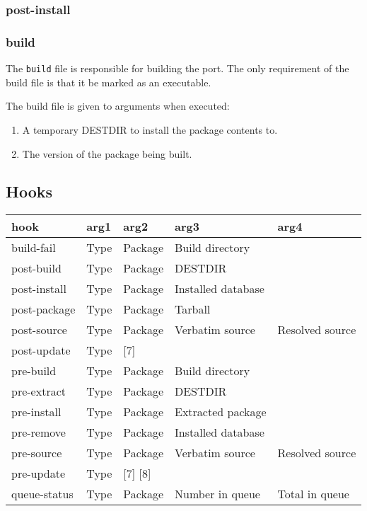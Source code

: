 \documentclass{article}
\begin{document}
\subsubsection{post-install}

\subsubsection{build}

The \texttt{build} file is responsible for building the port.
The only requirement of the build file is that it be marked as an executable.

The build file is given to arguments when executed:
\begin{enumerate}
\item A temporary DESTDIR to install the package contents to.
\item The version of the package being built.
\end{enumerate}

\subsection{Hooks}

\begin{center}
\begin{table}[]
\begin{tabular}{|l|l|l|l|l|}
  \hline
  hook          & arg1   & arg2     & arg3               & arg4           \\
  \hline
  build-fail    & Type   & Package  & Build directory    &                \\
  post-build    & Type   & Package  & DESTDIR            &                \\
  post-install  & Type   & Package  & Installed database &                \\
  post-package  & Type   & Package  & Tarball            &                \\
  post-source   & Type   & Package  & Verbatim source    & Resolved source\\
  post-update   & Type   & [7]      &                    &                \\
  pre-build     & Type   & Package  & Build directory    &                \\
  pre-extract   & Type   & Package  & DESTDIR            &                \\
  pre-install   & Type   & Package  & Extracted package  &                \\
  pre-remove    & Type   & Package  & Installed database &                \\
  pre-source    & Type   & Package  & Verbatim source    & Resolved source\\
  pre-update    & Type   & [7] [8]  &                    &                \\
  queue-status  & Type   & Package  & Number in queue    & Total in queue \\
  \hline
\end{tabular}
\end{table}
\end{center}
\end{document}
